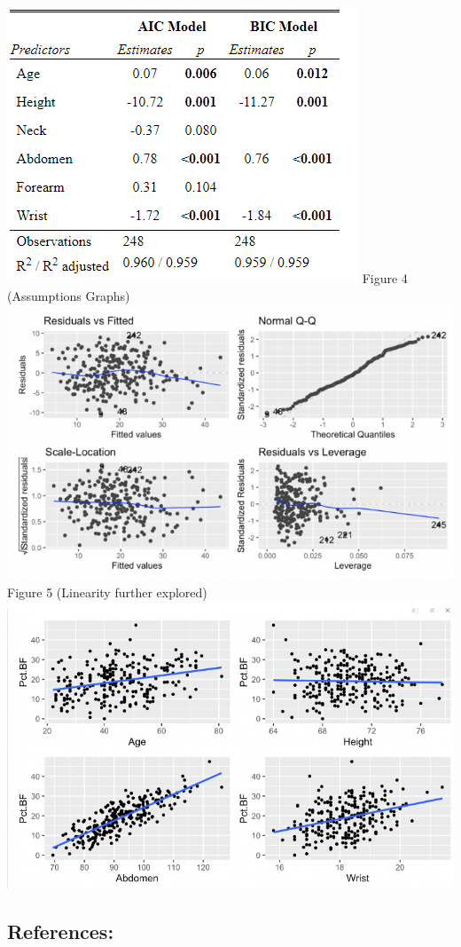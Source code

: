 \documentclass[letterpaper,9pt,twocolumn,twoside,]{pinp}
\begin{document}
\includegraphics{AIC vs BIC.png} Figure 4 (Assumptions Graphs)
\includegraphics{Assumptions.png} Figure 5 (Linearity further explored)
\includegraphics{Linearitytest.png}

\hypertarget{references}{%
\subsection{References:}\label{references}}
\end{document}
